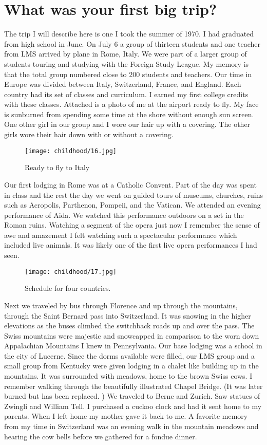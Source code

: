 \section{What was your first big trip?}
The trip I will describe here is one I took the summer of 1970.
I had graduated from high school in June.
On July 6 a group of thirteen students and one teacher from LMS arrived by plane in Rome, Italy.
We were part of a larger group of students touring and studying with the Foreign Study League.
My memory is that the total group numbered close to 200 students and teachers.
Our time in Europe was divided between Italy, Switzerland, France, and England.
Each country had its set of classes and curriculum.
I earned my first college credits with these classes.
Attached is a photo of me at the airport ready to fly.
My face is sunburned from spending some time at the shore without enough sun screen.
One other girl in our group and I wore our hair up with a covering.
The other girls wore their hair down with or without a covering.
\begin{figure}
\centering
\texttt{[image: childhood/16.jpg]}
\caption{
Ready to fly to Italy
}
\end{figure}

Our first lodging in Rome was at a Catholic Convent.
Part of the day was spent in class and the rest the day we went on guided tours of museums, churches, ruins such as Acropolis, Parthenon, Pompeii, and the Vatican.
We attended an evening performance of Aida.
We watched this performance outdoors on a set in the Roman ruins.
Watching a segment of the opera just now I remember the sense of awe and amazement I felt watching such a spectacular performance which included live animals.
It was likely one of the first live opera performances I had seen.
\begin{figure}
\centering
\texttt{[image: childhood/17.jpg]}
\caption{
Schedule for four countries.
}
\end{figure}
Next we traveled by bus through Florence and up through the mountains, through the Saint Bernard pass into Switzerland.
It was snowing in the higher elevations as the buses climbed the switchback roads up and over the pass.
The Swiss mountains were majestic and snowcapped in comparison to the worn down Appalachian Mountains I knew in Pennsylvania.
Our base lodging was a school in the city of Lucerne.
Since the dorms available were filled, our LMS group and a small group from Kentucky were given lodging in a chalet like building up in the mountains.
It was surrounded with meadows, home to the brown Swiss cows.
I remember walking through the beautifully illustrated Chapel Bridge.
(It was later burned but has been replaced.
) We traveled to Berne and Zurich.
Saw statues of Zwingli and William Tell.
I purchased a cuckoo clock and had it sent home to my parents.
When I left home my mother gave it back to me.
A favorite memory from my time in Switzerland was an evening walk in the mountain meadows and hearing the cow bells before we gathered for a fondue dinner.

